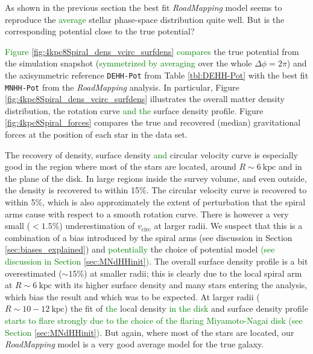 \documentclass[iop,revtex4,numberedappendix,appendixfloats]{emulateapj}
\newcommand{\RM}{{\sl RoadMapping}}
\newcommand{\NEW}[1]{\textcolor{Green}{#1}}
\newcommand{\OLD}[1]{}
\begin{document}
As shown in the previous section the best fit \RM{} model seems to reproduce the \NEW{average} stellar phase-space distribution quite well. But is the corresponding potential close to the true potential? 

\OLD{Figures \ref{fig:4kpc8Spiral_density}, \ref{fig:4kpc8Spiral_vcirc_surfdens} and \ref{fig:4kpc8Spiral_forces} compare}\NEW{Figure \ref{fig:4kpc8Spiral_dens_vcirc_surfdens} compares} the true potential from the simulation snapshot (\OLD{averaged}\NEW{symmetrized by averaging} over the whole $\Delta\phi=2\pi$) and the axisymmetric reference \texttt{DEHH-Pot} from Table \ref{tbl:DEHH-Pot} with the best fit \texttt{MNHH-Pot} from the \RM{} analysis. In particular, Figure \OLD{\ref{fig:4kpc8Spiral_density}}\NEW{\ref{fig:4kpc8Spiral_dens_vcirc_surfdens}} illustrates the overall matter density distribution, \OLD{Figure \ref{fig:4kpc8Spiral_vcirc_surfdens} }the rotation curve\OLD{,} \NEW{and the} surface density profile\NEW{.}\OLD{ and halo-to-disk ratio and} Figure \ref{fig:4kpc8Spiral_forces} compares the true and recovered (median) gravitational forces at the position of each star in the data set.

The recovery of density, surface density\OLD{,} \NEW{and} circular velocity curve \OLD{and disk-to-halo ratio} is especially good in the region where most of the stars are located, around $R\sim6~\text{kpc}$ and in the plane of the disk. In large regions inside the survey volume, and even outside, the density is recovered to within 15\%. The circular velocity curve is recovered to within 5\%, which is also approximately the extent of perturbation that the spiral arms cause with respect to a smooth rotation curve. There is however a very small ($<1.5\%$) underestimation of $v_\text{circ}$ at larger radii. We suspect that this is a combination of a bias introduced by the spiral arms (see \OLD{also} discussion in Section \OLD{\ref{sec:forces_bias}}\NEW{\ref{sec:biases_explained}}) and \NEW{potentially} the choice of potential model \OLD{(as a similar bias shows up in the \texttt{DEHH-Pot})}\NEW{(see discussion in Section \ref{sec:MNdHHinit})}. The overall surface density profile is a bit overestimated ($\sim 15\%$) at smaller radii; this is clearly due to the local spiral arm at $R\sim6~\text{kpc}$ with its higher surface density and many stars entering the analysis, which bias the result and which was to be expected. At larger radii ($R\sim10-12~\text{kpc}$) the fit of \OLD{radial}\NEW{the} local density \NEW{in the disk} and surface density profile \OLD{is not as accurate, which we ascribe to the Miyamoto-Nagai disk having a shallower radial profile than an exponential disk, and not enough stars in these outer regions to give good constraints}\NEW{starts to flare strongly due to the choice of the flaring Miyamoto-Nagai disk (see Section \ref{sec:MNdHHinit})}. \OLD{The much stronger bias in the disk-to-halo ratio at larger radii is the result of a misjudgment of the halo scale length. As we will see later (in Section \ref{sec:parameter recovery} and Figure \ref{fig:model_parameters}) we seem to need an even larger survey volume to have enough radial coverage to constrain the halo scale length properly.} But again, where most of the stars are located, our \RM{} model is a very good average model for the true galaxy.
\end{document}
